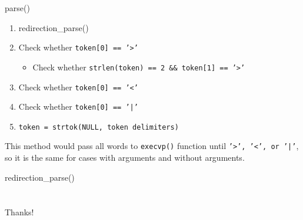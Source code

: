 \documentclass[12pt]{beamer}
\begin{document}
\begin{frame}{parse()}
    \begin{enumerate}
        \item redirection\_parse()
        \item Check whether \texttt{token[0] == '>'}
        \begin{itemize}
            \item Check whether \texttt{strlen(token) == 2 \&\& token[1] == '>'}
        \end{itemize}
        \item Check whether \texttt{token[0] == '<'}
        \item Check whether \texttt{token[0] == '|'}
        \item \texttt{token = strtok(NULL, token delimiters)}
    \end{enumerate}
    This method would pass all words to \texttt{execvp()} function until \texttt{'>', '<', or '|'}, so it is the same for cases with arguments and without arguments.
\end{frame}
\begin{frame}{redirection\_parse()}
\end{frame}



\section{}
\begin{frame}
    \begin{center}
        \Huge Thanks!
    \end{center}
\end{frame}
\end{document}
